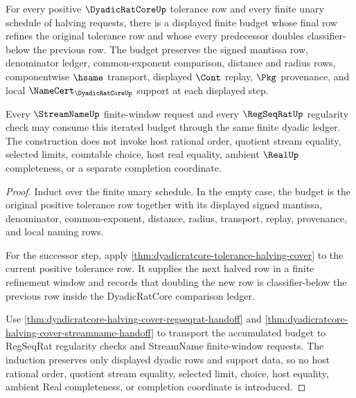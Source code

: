 \begin{theorem}
\label{thm:dyadicratcore-iterated-halving-budget}
For every positive $\DyadicRatCoreUp$ tolerance row and every finite unary schedule of halving requests, there is a displayed finite budget whose final row refines the original tolerance row and whose every predecessor doubles classifier-below the previous row. The budget preserves the signed mantissa row, denominator ledger, common-exponent comparison, distance and radius rows, componentwise $\hsame$ transport, displayed $\Cont$ replay, $\Pkg$ provenance, and local $\NameCert_{\DyadicRatCoreUp}$ support at each displayed step.

Every $\StreamNameUp$ finite-window request and every $\RegSeqRatUp$ regularity check may consume this iterated budget through the same finite dyadic ledger. The construction does not invoke host rational order, quotient stream equality, selected limits, countable choice, host real equality, ambient $\RealUp$ completeness, or a separate completion coordinate.
\end{theorem}
\begin{proof}
Induct over the finite unary schedule. In the empty case, the budget is the original positive tolerance row together with its displayed signed mantissa, denominator, common-exponent, distance, radius, transport, replay, provenance, and local naming rows.

For the successor step, apply \autoref{thm:dyadicratcore-tolerance-halving-cover} to the current positive tolerance row. It supplies the next halved row in a finite refinement window and records that doubling the new row is classifier-below the previous row inside the DyadicRatCore comparison ledger.

Use \autoref{thm:dyadicratcore-halving-cover-regseqrat-handoff} and \autoref{thm:dyadicratcore-halving-cover-streamname-handoff} to transport the accumulated budget to RegSeqRat regularity checks and StreamName finite-window requests. The induction preserves only displayed dyadic rows and support data, so no host rational order, quotient stream equality, selected limit, choice, host equality, ambient Real completeness, or completion coordinate is introduced.
\end{proof}

